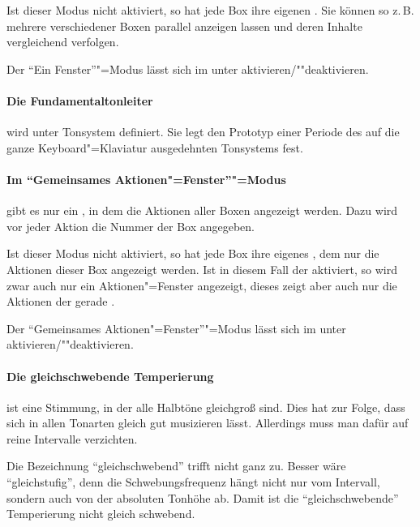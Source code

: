   Ist dieser Modus nicht aktiviert, so hat jede Box ihre eigenen
  . Sie können so z.\,B.
  mehrere 
  verschiedener Boxen parallel anzeigen lassen und deren Inhalte
  vergleichend verfolgen.

  Der "`Ein Fenster"'"=Modus lässt sich im
   unter  aktivieren/""deaktivieren.

\paragraph{Die Fundamentaltonleiter}\label{sec:DV_FUNDTONLEITER}\label{sec:DV_FT}
wird unter Tonsystem definiert. Sie legt den Prototyp einer Periode
des auf die ganze Keyboard"=Klaviatur ausgedehnten Tonsystems fest.

\paragraph{Im "`Gemeinsames
    Aktionen"=Fenster"'"=Modus}\label{sec:DV_CAW} gibt es nur ein
  , in dem die Aktionen
  aller Boxen angezeigt werden. Dazu wird vor jeder Aktion die Nummer
  der Box angegeben.

  Ist dieser Modus nicht aktiviert, so hat jede Box ihre eigenes
  , dem nur die Aktionen
  dieser Box angezeigt werden. Ist in diesem Fall der
   aktiviert, so wird zwar
  auch nur ein Aktionen"=Fenster angezeigt, dieses zeigt aber auch nur
  die Aktionen der gerade .

  Der "`Gemeinsames Aktionen"=Fenster"'"=Modus lässt sich im
   unter  aktivieren/""deaktivieren.

\paragraph{Die gleichschwebende Temperierung}\label{sec:MT_EQUAL} ist eine
  Stimmung, in der alle Halbtöne gleichgroß sind.  Dies hat zur Folge,
  dass sich in allen Tonarten gleich gut musizieren lässt.  Allerdings
  muss man dafür auf reine Intervalle verzichten. 

  Die Bezeichnung "`gleichschwebend"' trifft nicht ganz zu. Besser
  wäre "`gleichstufig"', denn die Schwebungsfrequenz hängt nicht nur
  vom Intervall, sondern auch von der absoluten Tonhöhe ab. Damit ist
  die "`gleichschwebende"' Temperierung nicht gleich schwebend.

